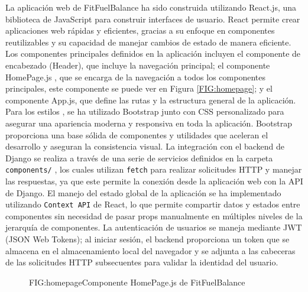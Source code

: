 La aplicación web de FitFuelBalance  ha sido construida utilizando React.js, una biblioteca de JavaScript para construir interfaces de usuario. React permite crear aplicaciones web rápidas y eficientes, gracias a su enfoque en componentes reutilizables y su capacidad de manejar cambios de estado de manera eficiente. Los componentes principales definidos en la aplicación incluyen el componente de encabezado (Header), que incluye la navegación principal; el componente HomePage.js , que se encarga de la navegación a todos los componentes principales, este componente se puede ver en Figura \ref{FIG:homepage}; y el componente App.js, que define las rutas y la estructura general de la aplicación. Para los estilos , se ha utilizado Bootstrap junto con CSS personalizado para asegurar una apariencia moderna y responsiva en toda la aplicación. Bootstrap proporciona una base sólida de componentes y utilidades que aceleran el desarrollo y aseguran la consistencia visual. La integración con el backend de Django se realiza a través de una serie de servicios definidos en la carpeta \texttt{components/} , los cuales utilizan \texttt{fetch}  para realizar solicitudes HTTP y manejar las respuestas, ya que este permite la conexión desde la aplicación web con la API de Django. El manejo del estado global de la aplicación se ha implementado utilizando \texttt{Context API} de React, lo que permite compartir datos y estados entre componentes sin necesidad de pasar props manualmente en múltiples niveles de la jerarquía de componentes. La autenticación de usuarios se maneja mediante JWT (JSON Web Tokens); al iniciar sesión, el backend proporciona un token que se almacena en el almacenamiento local del navegador y se adjunta a las cabeceras de las solicitudes HTTP subsecuentes para validar la identidad del usuario.

\begin{figure}[HomePage.js]{FIG:homepage}{Componente HomePage.js de FitFuelBalance}
\end{figure}

\newpage